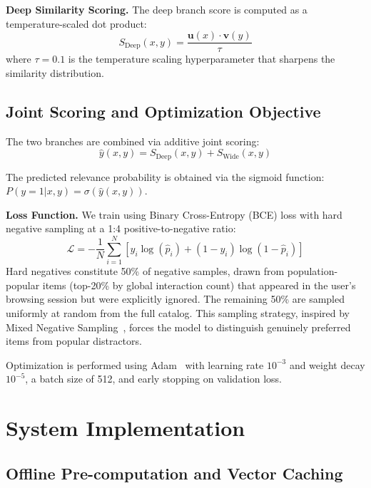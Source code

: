 \documentclass[10pt,conference]{IEEEtran}
\begin{document}
\textbf{Deep Similarity Scoring.} The deep branch score is computed as a temperature-scaled dot product:
\begin{equation}
S_{\text{Deep}}(x, y) = \frac{\mathbf{u}(x) \cdot \mathbf{v}(y)}{\tau}
\label{eq:deep_score}
\end{equation}
where $\tau = 0.1$ is the temperature scaling hyperparameter that sharpens the similarity distribution.

\subsection{Joint Scoring and Optimization Objective}
\label{subsec:joint_scoring}

The two branches are combined via additive joint scoring:
\begin{equation}
\hat{y}(x, y) = S_{\text{Deep}}(x, y) + S_{\text{Wide}}(x, y)
\label{eq:joint_logits}
\end{equation}

The predicted relevance probability is obtained via the sigmoid function: $P(y=1|x,y) = \sigma(\hat{y}(x,y))$.

\textbf{Loss Function.} We train using Binary Cross-Entropy (BCE) loss with hard negative sampling at a 1:4 positive-to-negative ratio:
\begin{equation}
\mathcal{L} = -\frac{1}{N} \sum_{i=1}^{N} \left[ y_i \log(\hat{p}_i) + (1 - y_i) \log(1 - \hat{p}_i) \right]
\label{eq:bce_loss}
\end{equation}
Hard negatives constitute 50\% of negative samples, drawn from population-popular items (top-20\% by global interaction count) that appeared in the user's browsing session but were explicitly ignored. The remaining 50\% are sampled uniformly at random from the full catalog. This sampling strategy, inspired by Mixed Negative Sampling~\cite{yang2020mixed}, forces the model to distinguish genuinely preferred items from popular distractors.

Optimization is performed using Adam~\cite{kingma2015adam} with learning rate $10^{-3}$ and weight decay $10^{-5}$, a batch size of 512, and early stopping on validation loss.


\section{System Implementation}
\label{sec:implementation}

\subsection{Offline Pre-computation and Vector Caching}
\label{subsec:offline_precompute}
\end{document}
